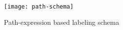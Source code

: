  
 	\begin{figure} 
 		\centering
 		\texttt{[image: path-schema]}
 		\caption{Path-expression based labeling schema}
 		\label{fig:path-schema}
 	\end{figure}
 
